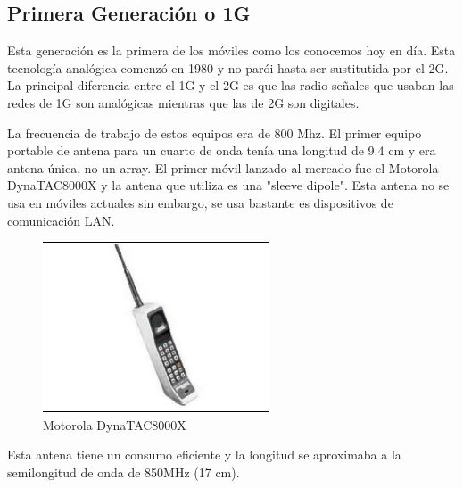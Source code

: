 \documentclass[a4paper,11pt,titlepage]{article}
\begin{document}
\subsection{Primera Generación o 1G}
Esta generación es la primera de los móviles como los conocemos hoy en día. Esta tecnología analógica comenzó en 1980 y no parói hasta ser sustitutida por el 2G. La principal diferencia entre el 1G y el 2G es que las radio señales que usaban las redes de 1G son analógicas mientras que las de 2G son digitales.\par
La frecuencia de trabajo de estos equipos era de 800 Mhz.
El primer equipo portable de antena para un cuarto de onda tenía una longitud de 9.4 cm y era antena única, no un array.
El primer móvil lanzado al mercado fue el Motorola DynaTAC8000X y la antena que utiliza es una "sleeve dipole". Esta antena no se usa en móviles actuales sin embargo, se usa bastante es dispositivos de comunicación LAN.\par
\begin{figure}[h]
\centering
\includegraphics[width=0.6\textwidth]{motorola1}
\caption{Motorola DynaTAC8000X}

\label{motoroladyna}
\end{figure}
Esta antena tiene un consumo eficiente y la longitud se aproximaba a la semilongitud de onda de 850MHz (17 cm).
\end{document}
